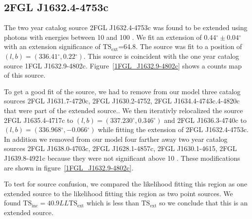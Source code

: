 \documentclass[12pt,preprint]{aastex}
\newcommand{\gev}{\text{GeV}\xspace}
\newcommand{\tsext}{{\ensuremath{\text{TS}_\text{ext}}}\xspace}
\newcommand{\tsinc}{\ensuremath{\text{TS}_\text{inc}}\xspace}
\newcommand{\loglikelihood}{\ensuremath{LL}\xspace}
\renewcommand{\deg}{\ensuremath{^\circ}\xspace}
\begin{document}

\subsection{2FGL J1632.4-4753c}
\label{section_2FGL_J1632.4-4753c}



The two year catalog source 2FGL J1632.4-4753c was found to be
extended using photons with energies between 10 \gev and 100 \gev.
We fit an extension of $0.44\deg\pm0.04\deg$ with an extension
significance of \tsext=64.8.  The source was fit to a position of
$(l,b)=(336.41\deg,0.22\deg)$.  This source is coincident with the one
year catalog source 1FGL J1632.9-4802c.  Figure~\ref{1FGL_J1632.9-4802c}
shows a counts map of this source.

To get a good fit of the source, we had to remove from our model
three catalog sources 2FGL J1631.7-4720c, 2FGL J1630.2-4752, 2FGL
J1634.4-4743c.4-4820c that were part of the extended source..
We then iterativly relocalized the source 2FGL J1635.4-4717c
to $(l,b)=(337.230\deg,0.346\deg)$ and 2FGL J1636.3-4740c to
$(l,b)=(336.968\deg,-0.066\deg)$ while fitting the extension of
2FGL J1632.4-4753c.  In addition we removed from our model four
farther away two year catalog sources 2FGL J1638.0-4703c, 2FGL
J1628.1-4857c, 2FGL  J1630.1-4615, 2FGL J1639.8-4921c because they
were not significant above 10 \gev.  These modifications are shown in
figure~\ref{1FGL_J1632.9-4802c}.

To test for source confusion, we compared the likelihood fitting this
region as one extended source to the likelihood fitting this region as
two point sources. We found $\tsinc=40.9\loglikelihood\tsext$ which is less than \tsext
so we conclude that this is an extended source.
\end{document}
